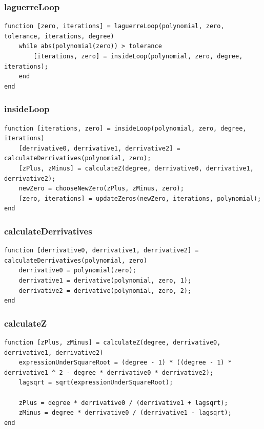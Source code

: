 \subsubsection{laguerreLoop}
\begin{simplechar}
\begin{lstlisting}
function [zero, iterations] = laguerreLoop(polynomial, zero, tolerance, iterations, degree)
    while abs(polynomial(zero)) > tolerance
        [iterations, zero] = insideLoop(polynomial, zero, degree, iterations);
    end
end
\end{lstlisting}
\end{simplechar}

\subsubsection{insideLoop}
\begin{simplechar}
\begin{lstlisting}
function [iterations, zero] = insideLoop(polynomial, zero, degree, iterations)
    [derrivative0, derrivative1, derrivative2] = calculateDerrivatives(polynomial, zero);
    [zPlus, zMinus] = calculateZ(degree, derrivative0, derrivative1, derrivative2);
    newZero = chooseNewZero(zPlus, zMinus, zero);
    [zero, iterations] = updateZeros(newZero, iterations, polynomial);
end
\end{lstlisting}
\end{simplechar}

\newpage
\subsubsection{calculateDerrivatives}
\begin{simplechar}
\begin{lstlisting}
function [derrivative0, derrivative1, derrivative2] = calculateDerrivatives(polynomial, zero)
    derrivative0 = polynomial(zero);
    derrivative1 = derivative(polynomial, zero, 1);
    derrivative2 = derivative(polynomial, zero, 2);
end
\end{lstlisting}
\end{simplechar}

\subsubsection{calculateZ}
\begin{simplechar}
\begin{lstlisting}
function [zPlus, zMinus] = calculateZ(degree, derrivative0, derrivative1, derrivative2)
    expressionUnderSquareRoot = (degree - 1) * ((degree - 1) * derrivative1 ^ 2 - degree * derrivative0 * derrivative2);
    lagsqrt = sqrt(expressionUnderSquareRoot);

    zPlus = degree * derrivative0 / (derrivative1 + lagsqrt);
    zMinus = degree * derrivative0 / (derrivative1 - lagsqrt);
end
\end{lstlisting}
\end{simplechar}

